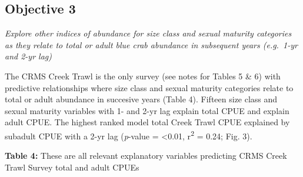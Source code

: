 \documentclass[
]{article}
\begin{document}
\newpage

\hypertarget{objective-3}{%
\subsection{Objective 3}\label{objective-3}}

\emph{Explore other indices of abundance for size class and sexual
maturity categories as they relate to total or adult blue crab abundance
in subsequent years (e.g.~1-yr and 2-yr lag)}

The CRMS Creek Trawl is the only survey (see notes for Tables 5 \& 6)
with predictive relationships where size class and sexual maturity
categories relate to total or adult abundance in succesive years (Table
4). Fifteen size class and sexual maturity variables with 1- and 2-yr
lag explain total CPUE and explain adult CPUE. The highest ranked model
total Creek Trawl CPUE explained by subadult CPUE with a 2-yr lag
(\emph{p}-value = \textless0.01, r\textsuperscript{2} = 0.24; Fig. 3).

\textbf{Table 4:} These are all relevant explanatory variables
predicting CRMS Creek Trawl Survey total and adult CPUEs
\end{document}
